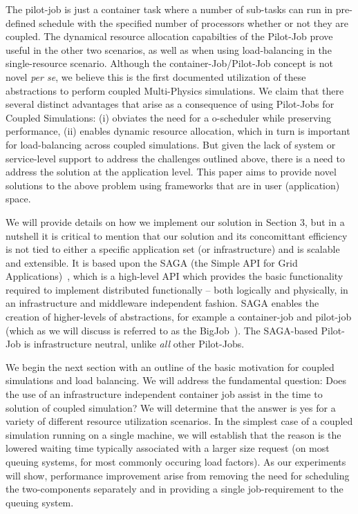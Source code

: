 \documentclass[conference,final]{IEEEtran}
\begin{document}
The pilot-job is just a container task where a number of sub-tasks can
run in pre-defined schedule with the specified number of processors
whether or not they are coupled.  The dynamical resource allocation
capabilties of the Pilot-Job prove useful in the other two scenarios,
as well as when using load-balancing in the single-resource scenario.
Although the container-Job/Pilot-Job concept is not novel {\it per
  se}, we believe this is the first documented utilization of these
abstractions to perform coupled Multi-Physics simulations. We claim
that there several distinct advantages that arise as a consequence of
using Pilot-Jobs for Coupled Simulations: (i) obviates the need for a
o-scheduler while preserving performance, (ii) enables dynamic
resource allocation, which in turn is important for load-balancing
across coupled simulations.  But given the lack of system or
service-level support to address the challenges outlined above, there
is a need to address the solution at the application level. This paper
aims to provide novel solutions to the above problem using frameworks
that are in user (application) space.
 
We will provide details on how we implement our solution in Section 3,
but in a nutshell it is critical to mention that our solution and its
concomittant efficiency is not tied to either a specific application
set (or infrastructure) and is scalable and extensible. It is based
upon the SAGA (the Simple API for Grid Applications)~\cite{saga_web},
which is a high-level API which provides the basic functionality
required to implement distributed functionally -- both logically and
physically, in an infrastructure and middleware independent
fashion. SAGA enables the creation of higher-levels of abstractions,
for example a container-job and pilot-job (which as we will discuss is
referred to as the BigJob~\cite{saga_royalsoc}). The SAGA-based
Pilot-Job is infrastructure neutral, unlike {\it all} other
Pilot-Jobs.

We begin the next section with an outline of the basic motivation for
coupled simulations and load balancing.  We will address the
fundamental question: Does the use of an infrastructure independent
container job assist in the time to solution of coupled simulation? We
will determine that the answer is yes for a variety of different
resource utilization scenarios. In the simplest case of a coupled
simulation running on a single machine, we will establish that the
reason is the lowered waiting time typically associated with a larger
size request (on most queuing systems, for most commonly occuring load
factors).  As our experiments will show, performance improvement arise
from removing the need for scheduling the two-components separately
and in providing a single job-requirement to the queuing system.
\end{document}

